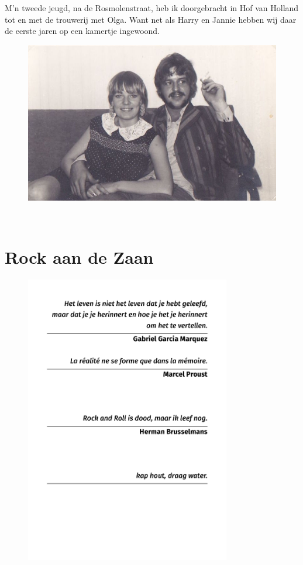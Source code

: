 \documentclass[12pt,twoside, openright]{memoir}
\begin{document}
M’n tweede jeugd, na de Rosmolenstraat, heb ik doorgebracht in Hof van Holland tot en met de trouwerij met Olga. Want net als Harry en Jannie hebben wij daar de eerste jaren op een kamertje ingewoond.

\begin{figure}
\centering
\includegraphics[width=\textwidth]{img/ch22/joho_0001}
\end{figure}

\clearpage
~
\clearpage
\chapter{Rock aan de Zaan}

\thispagestyle{empty}
\begin{flushright}
\begin{figure}
\includegraphics[width=0.8\textwidth, right]{img/epi/epi3}
\end{figure}
\end{flushright}
\end{document}
